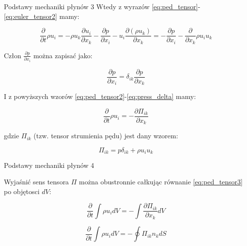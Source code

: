 \documentclass{beamer}
\begin{document}
\begin{frame}{Podstawy mechaniki płynów 3}
	Wtedy z wyrazów \eqref{eq:ped_tensor}-\eqref{eq:euler_tensor2} mamy:

	\begin{equation}
		\frac{\partial}{\partial t} \rho u_i =
		-\rho u_k \frac{\partial u_i}{\partial x_k}
		-\frac{\partial p}{\partial x_i}
		-u_i \frac{\partial (\rho u_k)}{\partial x_k}
		=-\frac{\partial p}{\partial x_i} -
		\frac{\partial}{\partial x_k}\rho u_i u_k
		\label{eq:ped_tensor2}
	\end{equation}

	Człon $\frac{\partial p}{\partial x_i}$ można zapisać jako:

	\begin{equation}
		\frac{\partial p}{\partial x_i} =
		\delta_{ik} \frac{\partial p}{\partial x_k}
		\label{eq:press_delta}
	\end{equation}

	I z powyższych wzorów \eqref{eq:ped_tensor2}-\eqref{eq:press_delta} mamy:

	\begin{equation}
		\frac{\partial}{\partial t} \rho u_i =
		-\frac{\partial \Pi_{ik}}{\partial x_k}
		\label{eq:ped_tensor3}
	\end{equation}

	gdzie $\Pi_{ik}$ (tzw. tensor strumienia pędu) jest dany wzorem:

	\begin{equation}
		\Pi_{ik} = p \delta_{ik} + \rho u_i u_k
		\label{eq:momentum_flux}
	\end{equation}

\end{frame}

\begin{frame}{Podstawy mechaniki płynów 4}

	Wyjaśnić sens tensora $\Pi$ można obustronnie całkując równanie
	\eqref{eq:ped_tensor3} po objętosci $dV$:

	\begin{equation}
		\frac{\partial}{\partial t} \int \rho u_i dV =
		-\int \frac{\partial \Pi_{ik}}{\partial x_k} dV
	\label{eq:ped_integral}
	\end{equation}

	\begin{equation}
		\frac{\partial}{\partial t} \int \rho u_i dV =
		-\oint \Pi_{ik} n_k dS
	\label{eq:ped_integral2}
	\end{equation}
\end{frame}
\end{document}

